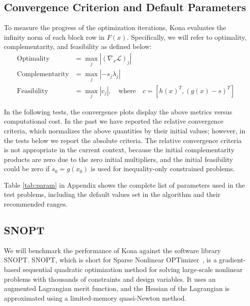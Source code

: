\subsection{Convergence Criterion and Default Parameters}
To measure the progress of the optimization iterations, Kona evaluates the infinity
norm of each block row in $F(x)$. Specifically, we will refer to optimality,
complementarity, and feasibility as defined below:
\begin{align*}\label{eq:optfeas}
\text{Optimality} &= \max_{j} | (\nabla_x \mathcal{L})_j |   \\           %
\text{Complementarity} &= \max_{j} | -s_j \lambda_j |      \\            %
\text{Feasibility} &=  \max_{j} |   c_j     |  , \quad \text{where} \quad c = \left[ h(x)^T,  (g(x) - s)^T \right]         %
\end{align*}


In the following tests, the convergence plots display the above metrics versus
computational cost.  In the past we have reported the relative convergence criteria, which normalizes the above quantities by their initial values; however, in the tests below we report the absolute criteria.
The relative convergence criteria is not appropriate in the current context, because the
 initial complementarity products are zero due to the zero initial multipliers, 
 and the initial feasibility could be zero if $s_0 = g(x_0)$ is used for inequality-only constrained problems. 

Table \ref{tab:param} in Appendix shows the complete list of parameters used in the test problems, including
the default values set in the algorithm and their recommended ranges.



\subsection{SNOPT}
We will benchmark the performance of Kona against the software library SNOPT.
SNOPT, which is short for Sparse Nonlinear OPTimizer~\cite{gill:2002}, is a gradient-based sequential 
quadratic optimization method for solving large-scale nonlinear problems 
with thousands of constraints and design variables. It uses an augmented Lagrangian 
merit function, and the Hessian of the Lagrangian is approximated
using a limited-memory quasi-Newton method. 

